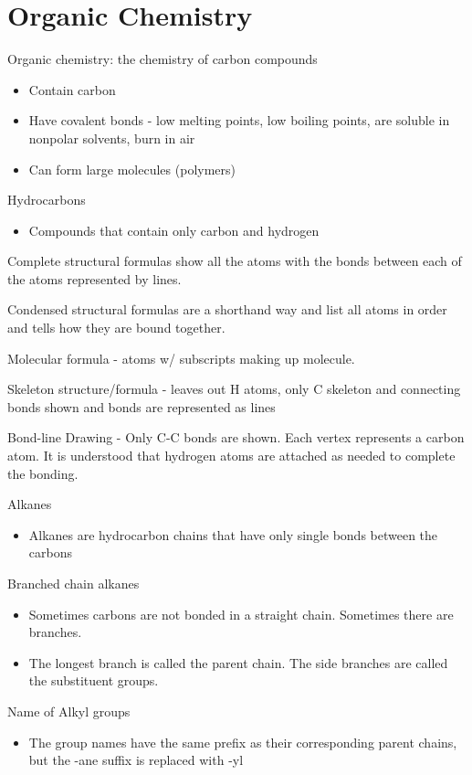 \documentclass[../hchem.tex]{subfiles}
\begin{document}
\chapter{Organic Chemistry}
Organic chemistry: the chemistry of carbon compounds
\begin{itemize}
    \item Contain carbon 
    \item Have covalent bonds - low melting points, low boiling points, are soluble in nonpolar solvents, burn in air 
    \item Can form large molecules (polymers)
\end{itemize}

Hydrocarbons
\begin{itemize}
    \item Compounds that contain only carbon and hydrogen 
\end{itemize}

Complete structural formulas show all the atoms with the bonds between each of the atoms represented by lines.

Condensed structural formulas are a shorthand way and list all atoms in order and tells how they are bound together.

Molecular formula - atoms w/ subscripts making up molecule.

Skeleton structure/formula - leaves out H atoms, only C skeleton and connecting bonds shown and bonds are represented as lines

Bond-line Drawing - Only C-C bonds are shown. Each vertex represents a carbon atom. It is understood that hydrogen atoms are attached as needed to complete the bonding.

Alkanes
\begin{itemize}
    \item Alkanes are hydrocarbon chains that have only single bonds between the carbons
\end{itemize}

Branched chain alkanes 
\begin{itemize}
    \item Sometimes carbons are not bonded in a straight chain. Sometimes there are branches.
    \item The longest branch is called the parent chain. The side branches are called the substituent groups.
\end{itemize}

Name of Alkyl groups 
\begin{itemize}
    \item The group names have the same prefix as their corresponding parent chains, but the -ane suffix is replaced with -yl
\end{itemize}
\end{document}

